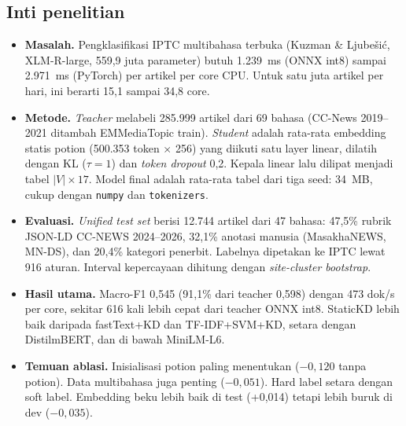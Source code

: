 \documentclass[10pt,a4paper]{article}
\begin{document}
\subsection{Inti penelitian}
\begin{itemize}
  \item \textbf{Masalah.} Pengklasifikasi IPTC multibahasa terbuka (Kuzman \& Ljube\v{s}i\'c, XLM-R-large, 559,9 juta parameter) butuh 1.239~ms (ONNX int8) sampai 2.971~ms (PyTorch) per artikel per core CPU. Untuk satu juta artikel per hari, ini berarti 15,1 sampai 34,8 core.
  \item \textbf{Metode.} \emph{Teacher} melabeli 285.999 artikel dari 69 bahasa (CC-News 2019--2021 ditambah EMMediaTopic train). \emph{Student} adalah rata-rata embedding statis potion (500.353 token $\times$ 256) yang diikuti satu layer linear, dilatih dengan KL ($\tau=1$) dan \emph{token dropout} 0,2. Kepala linear lalu dilipat menjadi tabel $|V|\times17$. Model final adalah rata-rata tabel dari tiga seed: 34~MB, cukup dengan \texttt{numpy} dan \texttt{tokenizers}.
  \item \textbf{Evaluasi.} \emph{Unified test set} berisi 12.744 artikel dari 47 bahasa: 47,5\% rubrik JSON-LD CC-NEWS 2024--2026, 32,1\% anotasi manusia (MasakhaNEWS, MN-DS), dan 20,4\% kategori penerbit. Labelnya dipetakan ke IPTC lewat 916 aturan. Interval kepercayaan dihitung dengan \emph{site-cluster bootstrap}.
  \item \textbf{Hasil utama.} Macro-F1 0,545 (91,1\% dari teacher 0,598) dengan 473 dok/s per core, sekitar 616 kali lebih cepat dari teacher ONNX int8. StaticKD lebih baik daripada fastText+KD dan TF-IDF+SVM+KD, setara dengan DistilmBERT, dan di bawah MiniLM-L6.
  \item \textbf{Temuan ablasi.} Inisialisasi potion paling menentukan ($-0{,}120$ tanpa potion). Data multibahasa juga penting ($-0{,}051$). Hard label setara dengan soft label. Embedding beku lebih baik di test (+0,014) tetapi lebih buruk di dev ($-0{,}035$).
\end{itemize}
\end{document}
